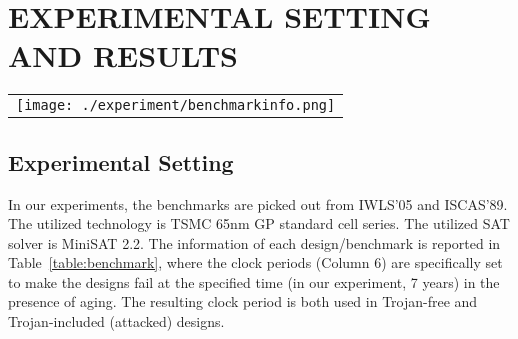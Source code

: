 \section{EXPERIMENTAL SETTING AND RESULTS}
\label{sec:mot}

\begin{table*}
\centering
\caption{Benchmark information and average probabilities of Monte-Carlo instances}
	\begin{tabular}{l}
	\texttt{[image: ./experiment/benchmarkinfo.png]}
	\end{tabular}
\label{table:benchmark}
\end{table*}

\begin{figure*}[!ht]
    \centering
    \hspace{0.1cm}
    \hspace{0.1cm}
    \hspace{0.1cm}
    \caption{Lifetime distributions of Monte-Carlo Instances of Trojan-included \textit{s38417}, \textit{des\_perf}, and \textit{leo3mp}}
    \label{fig:exp}
\end{figure*}

\subsection{Experimental Setting}
\label{sec:exp:tc}
In our experiments, the benchmarks are picked out from IWLS'05 and ISCAS'89. The utilized technology is TSMC 65nm GP standard cell series. The utilized SAT solver is MiniSAT 2.2. The information of each design/benchmark is reported in Table~\ref{table:benchmark}, where the clock periods (Column 6) are specifically set to make the designs fail at the specified time (in our experiment, 7 years) in the presence of aging. The resulting clock period is both used in Trojan-free and Trojan-included (attacked) designs. 
